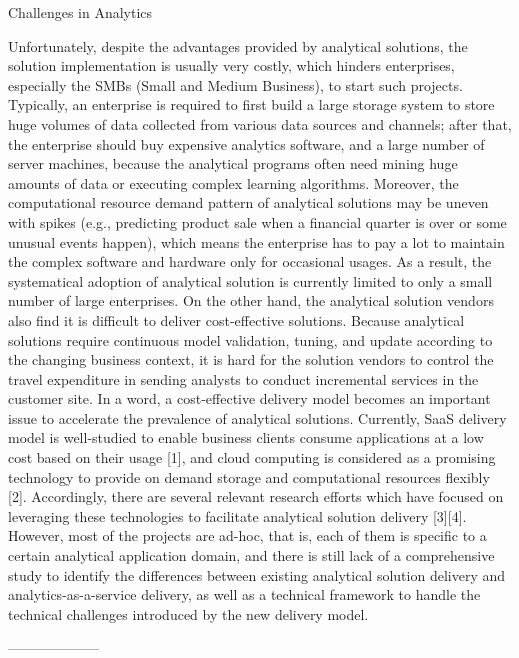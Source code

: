 Challenges in Analytics

Unfortunately, despite the advantages provided by analytical solutions, the solution implementation is usually very costly, which hinders enterprises, especially the SMBs (Small and Medium Business), to start such projects. Typically, an enterprise is required to first build a large
storage system to store huge volumes of data collected from various data sources and channels; after that, the enterprise should buy expensive analytics software, and a large number of server machines, because the analytical programs often need mining huge amounts of data or executing complex learning algorithms. Moreover, the computational resource demand pattern of analytical solutions may be uneven with spikes (e.g., predicting product sale when a financial quarter is over or some unusual events happen), which means the enterprise has to pay a lot to maintain the complex software and hardware only for occasional usages. As a result, the systematical adoption of analytical
solution is currently
limited to only a small number of large enterprises. On the other hand, the analytical solution vendors also
find it is difficult to deliver cost-effective solutions. Because analytical solutions
require continuous model validation,
tuning, and update according to the changing business context,
it is hard for the solution vendors to control
the
travel expenditure in sending analysts to conduct incremental services in the customer site. In a word, a cost-effective delivery model becomes an
important
issue to accelerate the prevalence of analytical
solutions. Currently, SaaS delivery model is well-studied to enable business clients consume applications at a low cost based on their usage [1], and cloud computing is considered as a promising technology to provide on demand storage and computational resources flexibly [2]. Accordingly, there are several
relevant research efforts which have focused on
leveraging these technologies to facilitate analytical solution delivery [3][4]. However, most of the projects are ad-hoc, that is, each of them is
specific to a certain analytical
application domain, and there is still lack of a comprehensive study to identify the differences between existing analytical solution delivery and analytics-as-a-service delivery, as well as a technical framework to handle the technical challenges introduced by the new delivery model.


--------------------

